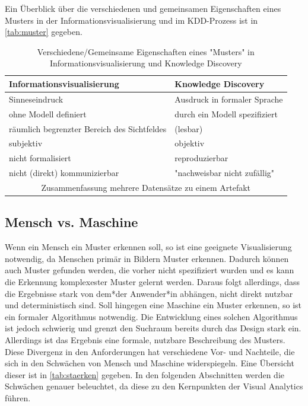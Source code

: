 		Ein Überblick über die verschiedenen und gemeinsamen Eigenschaften eines Musters in der Informationsvisualisierung und im KDD-Prozess ist in \autoref{tab:muster} gegeben.

		\begin{table}
			\centering
			\begin{tabular}{l|l}
				\toprule
				\textbf{Informationsvisualisierung}         & \textbf{Knowledge Discovery}  \\ \midrule
				Sinneseindruck                              & Ausdruck in formaler Sprache  \\
				ohne Modell definiert                       & durch ein Modell spezifiziert \\
				räumlich begrenzter Bereich des Sichtfeldes & (lesbar)                      \\
				subjektiv                                   & objektiv                      \\
				nicht formalisiert                          & reproduzierbar                \\
				nicht (direkt) kommunizierbar               & "nachweisbar nicht zufällig"  \\
				\multicolumn{2}{c}{Zusammenfassung mehrere Datensätze zu einem Artefakt}    \\ \bottomrule
			\end{tabular}
			\caption{Verschiedene/Gemeinsame Eigenschaften eines "Musters" in Informationsvisualisierung und Knowledge Discovery}
			\label{tab:muster}
		\end{table}

		\subsection{Mensch vs. Maschine}
			Wenn ein Mensch ein Muster erkennen soll, so ist eine geeignete Visualisierung notwendig, da Menschen primär in Bildern Muster erkennen. Dadurch können auch Muster gefunden werden, die vorher nicht spezifiziert wurden und es kann die Erkennung komplexester Muster gelernt werden. Daraus folgt allerdings, dass die Ergebnisse stark von dem*der Anwender*in abhängen, nicht direkt nutzbar und deterministisch sind. Soll hingegen eine Maschine ein Muster erkennen, so ist ein formaler Algorithmus notwendig. Die Entwicklung eines solchen Algorithmus ist jedoch schwierig und grenzt den Suchraum bereits durch das Design stark ein. Allerdings ist das Ergebnis eine formale, nutzbare Beschreibung des Musters. Diese Divergenz in den Anforderungen hat verschiedene Vor- und Nachteile, die sich in den Schwächen von Mensch und Maschine widerspiegeln. Eine Übersicht dieser ist in \autoref{tab:staerken} gegeben. In den folgenden Abschnitten werden die Schwächen genauer beleuchtet, da diese zu den Kernpunkten der Visual Analytics führen.


